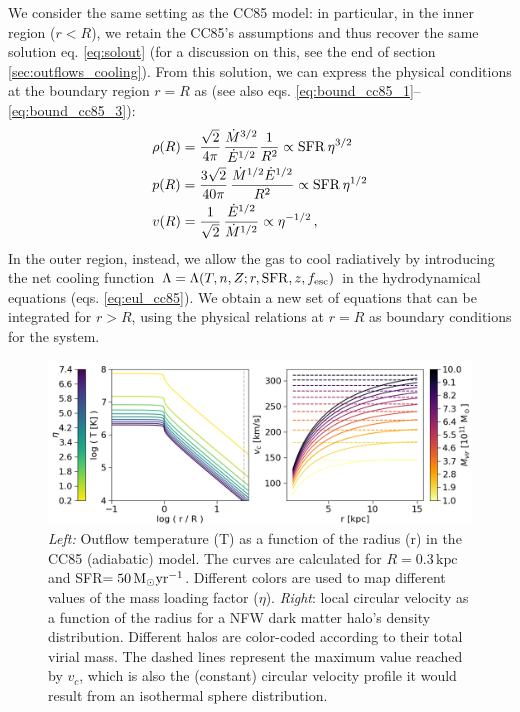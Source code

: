 We consider the same setting as the CC85 model: in particular, in the inner region ($r<R$), we retain the CC85's assumptions and thus recover the same solution eq. \ref{eq:solout} (for a discussion on this, see the end of section \ref{sec:outflows_cooling}). From this solution, we can express the physical conditions at the boundary region $r=R$ as (see also eqs. \ref{eq:bound_cc85_1}--\ref{eq:bound_cc85_3}):
\begin{subequations} \label{eq:boundary}
\begin{align}
&\rho(R)=\frac{\sqrt{2}}{4\pi}\,\frac{\dot{M}^{3/2}}{\dot{E}^{1/2}}\frac{1}{R^2}\propto {\rm SFR}\, \eta^{3/2}\\
&p(R)=\frac{3\sqrt{2}}{40\pi}\,\frac{\dot{M}^{1/2}\dot{E}^{1/2}}{R^2}\propto {\rm SFR} \,\eta^{1/2}\\
&v(R)=\frac{1}{\sqrt{2}}\,\frac{\dot{E}^{1/2}}{\dot{M}^{1/2}}\propto \eta^{-1/2}\,,\label{eq:v_boundary}
\end{align}
\end{subequations}
In the outer region, instead, we allow the gas to cool radiatively by introducing the net cooling function $\Lambda = \Lambda(T,n,Z;r,\mathrm{SFR},z,f_{\rm esc})$ in the hydrodynamical equations (eqs. \ref{eq:eul_cc85}). We obtain a new set of equations that can be integrated for $r>R$, using the physical relations at $r=R$ as boundary conditions for the system. 

\begin{figure}
	\centering
	\includegraphics[width=1.0\textwidth]{plots/cc85+NFW.png}
	\caption{\textit{Left:} Outflow temperature (T) as a function of the radius (r) in the CC85 (adiabatic) model. The curves are calculated for $R=0.3\,\mathrm{kpc}$ and SFR$=50 \, {\rm M}_{\odot} \rm yr^{-1}$. Different colors are used to map different values of the mass loading factor ($\eta$). \textit{Right}: local circular velocity as a function of the radius for a NFW \citep{NFW_profile} dark matter halo's density distribution. Different halos are color-coded according to their total virial mass. The dashed lines represent the maximum value reached by $v_c$, which is also the (constant) circular velocity profile it would result from an isothermal sphere distribution.
	\label{fig:temp_CC85}
	}
\end{figure}

